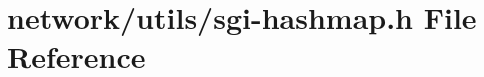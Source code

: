 \hypertarget{sgi-hashmap_8h}{}\section{network/utils/sgi-\/hashmap.h File Reference}
\label{sgi-hashmap_8h}

